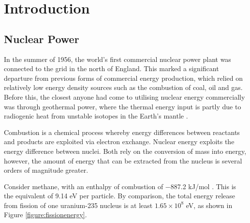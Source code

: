 \chapter{Introduction} \label{introduction}

\section{Nuclear Power} %

In the summer of 1956, the world's first commercial nuclear power plant was connected to the grid in the north of England. This marked a significant departure from previous forms of commercial energy production, which relied on relatively low energy density sources such as the combustion of coal, oil and gas. Before this, the closest anyone had come to utilising nuclear energy commercially was through geothermal power, where the thermal energy input is partly due to radiogenic heat from unstable isotopes in the Earth's mantle \cite{gando2011partial}. 

Combustion is a chemical process whereby energy differences between reactants and products are exploited via electron exchange. Nuclear energy exploits the energy difference between nuclei. Both rely on the conversion of mass into energy, however, the amount of energy that can be extracted from the nucleus is several orders of magnitude greater.

Consider methane, with an enthalpy of combustion of −887.2 kJ/mol \cite{thornton1917xv}. This is the equivalent of 9.14 eV per particle. By comparison, the total energy release from fission of one uranium-235 nucleus is at least $1.65 \times 10^{8}$ eV, as shown in Figure \ref{figure:fissionenergy}.


